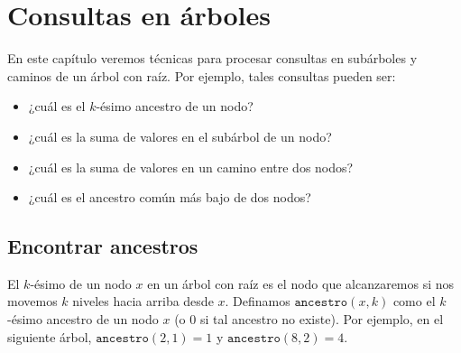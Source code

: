 \chapter{Consultas en árboles}


En este capítulo veremos técnicas para procesar consultas en
subárboles y caminos de un árbol con raíz. Por ejemplo, tales
consultas pueden ser:
\begin{itemize}
    \item ¿cuál es el $k$-ésimo ancestro de un nodo?
    \item ¿cuál es la suma de valores en el subárbol de un nodo?
    \item ¿cuál es la suma de valores en un camino entre dos nodos?
    \item ¿cuál es el ancestro común más bajo de dos nodos?
\end{itemize}

\section{Encontrar ancestros}


El $k$-ésimo  de un nodo $x$ en un árbol con raíz es el
nodo que alcanzaremos si nos movemos $k$ niveles hacia arriba desde $x$.
Definamos $\texttt{ancestro}(x,k)$ como el $k$-ésimo ancestro de un nodo
$x$ (o $0$ si tal ancestro no existe). Por ejemplo, en el siguiente árbol,
$\texttt{ancestro}(2,1)=1$ y $\texttt{ancestro}(8,2)=4$.
\begin{center}
\end{center}

